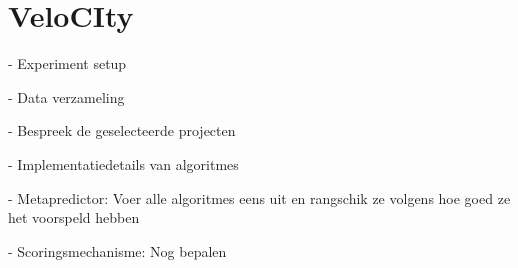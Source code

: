 \chapter{VeloCIty}

- Experiment setup

  -  Data verzameling

  - Bespreek de geselecteerde projecten

- Implementatiedetails van algoritmes

- Metapredictor: Voer alle algoritmes eens uit en rangschik ze volgens hoe goed ze het voorspeld hebben

- Scoringsmechanisme: Nog bepalen
